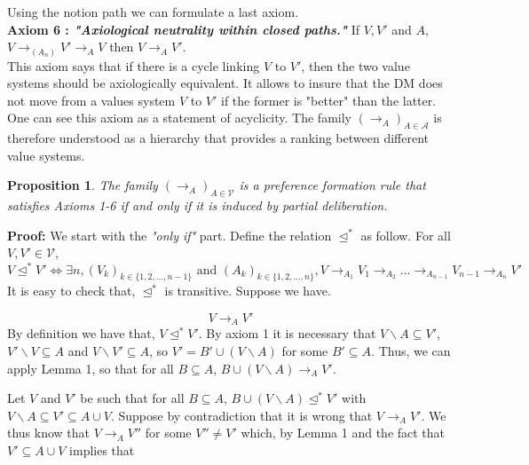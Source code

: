\documentclass[11pt]{article}
\newtheorem{proposition}{Proposition}
\begin{document}
Using the notion path we can formulate a last axiom.
\\

\noindent
\textbf{Axiom 6 : \textit{"Axiological neutrality within closed paths."}} If $V,V'$ and $A$, $V\rightarrow_{(A_n)} V'\rightarrow_{A} V$ then $V \rightarrow_{A} V'$.
\\

This axiom says that if there is a cycle linking $V$ to $V'$, then the two value systems should be axiologically equivalent. It allows to insure that the DM does not move from a values system $V$ to $V'$ if the former is "better" than the latter. One can see this axiom as a statement of acyclicity. The family  $(\rightarrow_{A})_{A\in\mathcal{A}}$ is therefore understood as a hierarchy that provides a ranking between different value systems. 
\\ 

\begin{proposition}

The family $(\rightarrow_{A})_{A\in\mathcal{V}}$ is a preference formation rule that satisfies Axioms 1-6 if and only if it is induced by partial deliberation.
\label{Prop1}
\end{proposition}  


\noindent
\textbf{Proof:} We start with the \textit{"only if"} part. Define the relation $\trianglelefteq^*$ as follow. For all $V,V'\in\mathcal{V}$,
\begin{equation}
V \trianglelefteq^* V' \iff \exists n, (V_k)_{k\in\{1,2,...,n-1\}}\text{ and }(A_k)_{k\in\{1,2,...,n\}}, V\rightarrow_{A_1} V_1 \rightarrow_{A_2}...\rightarrow_{A_{n-1}} V_{n-1}\rightarrow_{A_n}V'
\end{equation}
It is easy to check that, $\trianglelefteq^*$ is transitive. Suppose we have.


\begin{equation}
V\rightarrow_A V'
\label{Cont6}
\end{equation}
By definition we have that, $V\trianglelefteq^* V'$. By axiom 1 it is necessary that $V\backslash A\subseteq V'$, $V'\backslash V\subseteq A$ and $V\backslash V'\subseteq A$, so $V'=B'\cup (V\backslash A)$ for some $B'\subseteq A$. Thus, we can apply Lemma 1, so that for all $B\subseteq A$, $B\cup (V\backslash A)\rightarrow_A V'$. 

Let $V$ and $V'$ be such that for all $B \subseteq A$,  $B\cup (V\backslash A)\trianglelefteq^* V'$ with $V\backslash A \subseteq V'\subseteq A\cup V$. Suppose by contradiction that it is wrong that $V\rightarrow_A V'$. We thus know that $V\rightarrow_A V''$ for some $V''\not= V'$ which, by Lemma 1 and the fact that $V'\subseteq A\cup V$ implies that 
\end{document}
